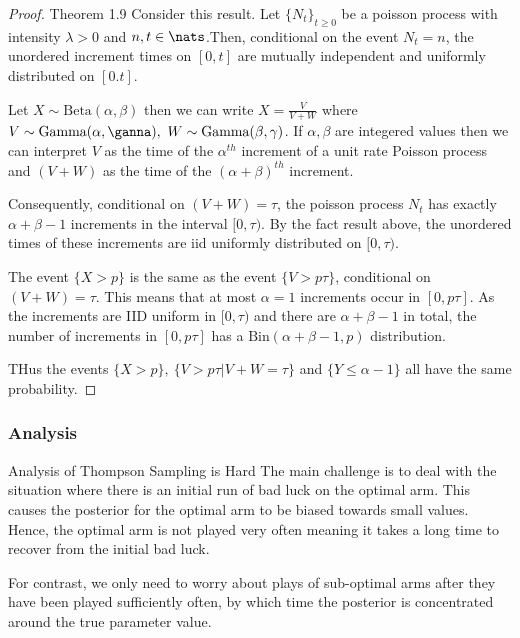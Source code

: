 \documentclass[11pt,a4paper]{article}
\begin{document}
\begin{proof}{Theorem 1.9}
  Consider this result. Let $\{N_t\}_{t\geq0}$ be a poisson process with intensity $\lambda>0$ and $n,t\in\nats$.Then, conditional on the event $N_t=n$, the unordered increment times on $[0,t]$ are mutually independent and uniformly distributed on $[0.t]$.
  \par Let $X\sim\text{Beta}(\alpha,\beta)$ then we can write $X=\frac{V}{V+W}$ where $V\sim\text{Gamma}(\alpha,\ganna),\ W\sim\text{Gamma}(\beta,\gamma)$. If $\alpha,\beta$ are integered values then we can interpret $V$ as the time of the $\alpha^{th}$ increment of a unit rate Poisson process and $(V+W)$ as the time of the $(\alpha+\beta)^{th}$ increment.
  \par Consequently, conditional on $(V+W)=\tau$, the poisson process $N_t$ has exactly $\alpha+\beta-1$ increments in the interval $[0,\tau)$. By the fact result above, the unordered times of these increments are iid uniformly distributed on $[0,\tau)$.
  \par The event $\{X>p\}$ is the same as the event $\{V>p\tau\}$, conditional on $(V+W)=\tau$. This means that at most $\alpha=1$ increments occur in $[0,p\tau]$. As the increments are IID uniform in $[0,\tau)$ and there are $\alpha+\beta-1$ in total, the number of increments in $[0,p\tau]$  has a $\text{Bin}(\alpha+\beta-1,p)$ distribution.
  \par THus the events $\{X>p\},\ \{V>p\tau|V+W=\tau\}$ and $\{Y\leq\alpha-1\}$ all have the same probability.\hfill\proved
\end{proof}

\subsubsection{Analysis}

\begin{remark}{Analysis of Thompson Sampling is Hard}
  The main challenge is to deal with the situation where there is an initial run of bad luck on the optimal arm. This causes the posterior for the optimal arm to be biased towards small values. Hence, the optimal arm is not played very often meaning it takes a long time to recover from the initial bad luck.
  \par For contrast, we only need to worry about plays of sub-optimal arms after they have been played sufficiently often, by which time the posterior is concentrated around the true parameter value.
\end{remark}
\end{document}
